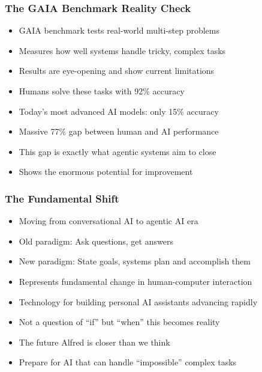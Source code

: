 \begin{frame}[fragile]\frametitle{The GAIA Benchmark Reality Check}
      \begin{itemize}
        \item GAIA benchmark tests real-world multi-step problems
        \item Measures how well systems handle tricky, complex tasks
        \item Results are eye-opening and show current limitations
        \item Humans solve these tasks with 92\% accuracy
        \item Today's most advanced AI models: only 15\% accuracy
        \item Massive 77\% gap between human and AI performance
        \item This gap is exactly what agentic systems aim to close
        \item Shows the enormous potential for improvement
      \end{itemize}
\end{frame}

\begin{frame}[fragile]\frametitle{The Fundamental Shift}
      \begin{itemize}
        \item Moving from conversational AI to agentic AI era
        \item Old paradigm: Ask questions, get answers
        \item New paradigm: State goals, systems plan and accomplish them
        \item Represents fundamental change in human-computer interaction
        \item Technology for building personal AI assistants advancing rapidly
        \item Not a question of ``if'' but ``when'' this becomes reality
        \item The future Alfred is closer than we think
        \item Prepare for AI that can handle ``impossible'' complex tasks
      \end{itemize}
\end{frame}


